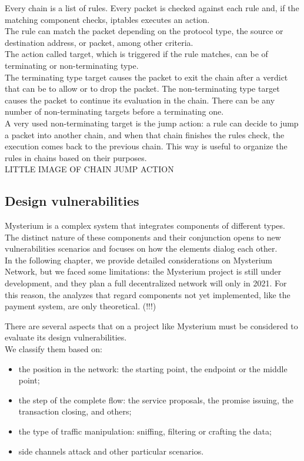 \documentclass[]{article}
\begin{document}
	Every chain is a list of rules. Every packet is checked against each rule and, if the matching component checks, iptables executes an action.\\
	The rule can match the packet depending on the protocol type, the source or destination address, or packet, among other criteria.\\
	The action called target, which is triggered if the rule matches, can be of terminating or non-terminating type.\\
	The terminating type target causes the packet to exit the chain after a verdict that can be to allow or to drop the packet. The non-terminating type target causes the packet to continue its evaluation in the chain. There can be any number of non-terminating targets before a terminating one.\\
	A very used non-terminating target is the jump action: a rule can decide to jump a packet into another chain, and when that chain finishes the rules check, the execution comes back to the previous chain. This way is useful to organize the rules in chains based on their purposes.\\

	LITTLE IMAGE OF CHAIN JUMP ACTION

	\subsection{Design vulnerabilities}

	Mysterium is a complex system that integrates components of different types. The distinct nature of these components and their conjunction opens to new vulnerabilities scenarios and focuses on how the elements dialog each other.\\
	In the following chapter, we provide detailed considerations on Mysterium Network, but we faced some limitations: the Mysterium project is still under development, and they plan a full decentralized network will only in 2021. For this reason, the analyzes that regard components not yet implemented, like the payment system, are only theoretical. (!!!) 

	There are several aspects that on a project like Mysterium must be considered to evaluate its design vulnerabilities.\\
	We classify them based on:
	\begin{itemize}
		\item the position in the network: the starting point, the endpoint or the middle point;
		\item the step of the complete flow: the service proposals, the promise issuing, the transaction closing, and others;
		\item the type of traffic manipulation: sniffing, filtering or crafting the data;
		\item side channels attack and other particular scenarios.
	\end{itemize}
	
\end{document}
